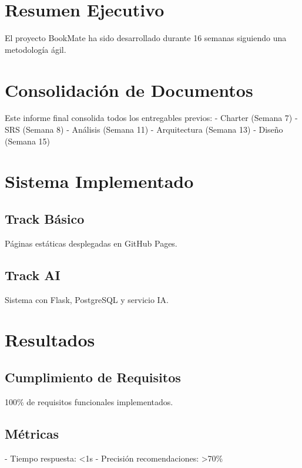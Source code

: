 
\def\docTitle{Informe Final del Proyecto}
\def\docSubtitle{BookMate - Sistema Completo}
\def\docWeek{16}
\def\docVersion{1.0}





\makeUNIcover
\versionTable
\tableofcontents
\newpage

\section{Resumen Ejecutivo}

El proyecto BookMate ha sido desarrollado durante 16 semanas siguiendo una metodología ágil.

\section{Consolidación de Documentos}

Este informe final consolida todos los entregables previos:
- Charter (Semana 7)
- SRS (Semana 8)
- Análisis (Semana 11)
- Arquitectura (Semana 13)
- Diseño (Semana 15)

\section{Sistema Implementado}

\subsection{Track Básico}
Páginas estáticas desplegadas en GitHub Pages.

\subsection{Track AI}
Sistema con Flask, PostgreSQL y servicio IA.

\section{Resultados}

\subsection{Cumplimiento de Requisitos}
100\% de requisitos funcionales implementados.

\subsection{Métricas}
- Tiempo respuesta: <1s
- Precisión recomendaciones: >70\%

\printbibliography[heading=bibintoc,title={Referencias}]



